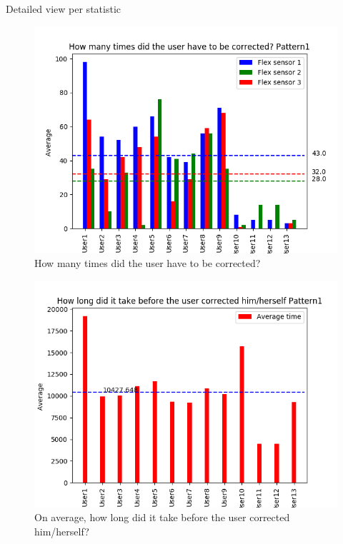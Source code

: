 \documentclass[sigconf]{acmart}
\begin{document}
Detailed view per statistic
\begin{figure}[h]
\centering
\includegraphics[width=\columnwidth , scale=1]{p1_q1.png}
\caption{How many times did the user have to be corrected?}
\end{figure}

\begin{figure}[h]
\centering
\includegraphics[width=\columnwidth, scale=1]{p1_q2.png}
\caption{On average, how long did it take before the user corrected him/herself?}
\end{figure}
\end{document}
